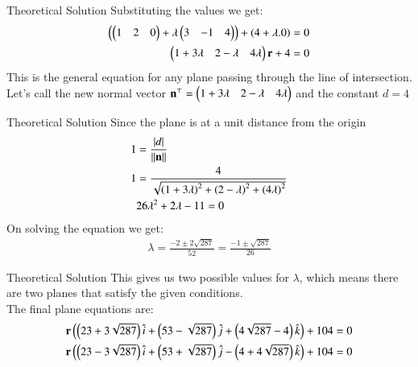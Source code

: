 \documentclass{beamer}
\begin{document}
\begin{frame}{Theoretical Solution}
Substituting the values we get:
\begin{align}
    \left(\begin{pmatrix}1 & 2 & 0\end{pmatrix} + \lambda\begin{pmatrix}3 & -1 & 4\end{pmatrix}\right)+\left(4+\lambda.0\right)=0\\
    \begin{pmatrix}1+3\lambda&2-\lambda&4\lambda\end{pmatrix}\mathbf{r}+4=0
\end{align}
This is the general equation for any plane passing through the line of intersection. Let's call the new normal vector $\mathbf{n}^{\top}=\begin{pmatrix}1+3\lambda&2-\lambda&4\lambda\end{pmatrix}$ and the constant $d=4$\\

\end{frame}
\begin{frame}{Theoretical Solution}
Since the plane is at a unit distance from the origin
\begin{align}
    1&=\frac{|d|}{\left\lVert\mathbf{n}\right\rVert}\\
    1&=\frac{4}{\sqrt{\left(1+3\lambda\right)^2+\left(2-\lambda\right)^2+\left(4\lambda\right)^2}}\\
    &26\lambda^2+2\lambda-11=0
\end{align}
On solving the equation we get:
\begin{align}
    \lambda = \frac{-2 \pm 2\sqrt{287}}{52} = \frac{-1 \pm \sqrt{287}}{26}
\end{align}
\end{frame}
\begin{frame}{Theoretical Solution}
This gives us two possible values for $\lambda$, which means there are two planes that satisfy the given conditions.\\
The final plane equations are:
\begin{align}
    \mathbf{r} \left(\left(23 + 3\sqrt{287}\right)\hat{i} + \left(53 - \sqrt{287}\right)\hat{j} + \left(4\sqrt{287} - 4\right)\hat{k}\right) + 104 = 0\\
    \mathbf{r}\left(\left(23 - 3\sqrt{287}\right)\hat{i} + \left(53 + \sqrt{287}\right)\hat{j} - \left(4 + 4\sqrt{287}\right)\hat{k}\right) + 104 = 0
\end{align}

    
\end{frame}
\end{document}
